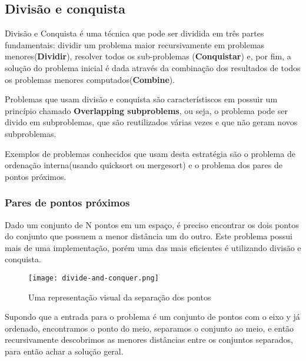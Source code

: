 \subsection{Divisão e conquista}

    Divisão e Conquista é uma técnica que pode ser dividida em três 
    partes fundamentais: dividir um problema maior recursivamente em 
    problemas menores(\textbf{Dividir}), resolver todos os 
    sub-problemas (\textbf{Conquistar}) e, por fim, a solução do problema inicial 
    é dada através da combinação dos resultados de todos os problemas 
    menores computados(\textbf{Combine}). 

    Problemas que usam divisão e conquista são característiscos em possuir um princípio 
    chamado \textbf{Overlapping subproblems}, ou seja, o problema pode ser divido em 
    subproblemas, que são reutilizados várias vezes e que não geram novos subproblemas.
    
    Exemplos de problemas conhecidos que usam desta estratégia são o problema de 
    ordenação interna(usando quicksort ou mergesort) e o problema dos pares de pontos próximos.

\subsubsection{Pares de pontos próximos}

    Dado um conjunto de N pontos em um espaço, é preciso encontrar os dois pontos do conjunto que possuem a 
    menor distância um do outro. Este problema possui mais de uma implementação, porém 
    uma das mais eficientes é utilizando divisão e conquista.

    \begin{figure}[ht]
        \centering
        \texttt{[image: divide-and-conquer.png]}
        \caption{Uma representação visual da separação dos pontos}
        \label{fig:divide-and-conquer}
    \end{figure}

    Supondo que a entrada para o problema é um conjunto de pontos com o eixo y já ordenado,
    encontramos o ponto do meio, separamos o conjunto ao meio, e então recursivamente descobrimos
    as menores distâncias entre os conjuntos separados, para então achar a solução geral.

    \newpage 

